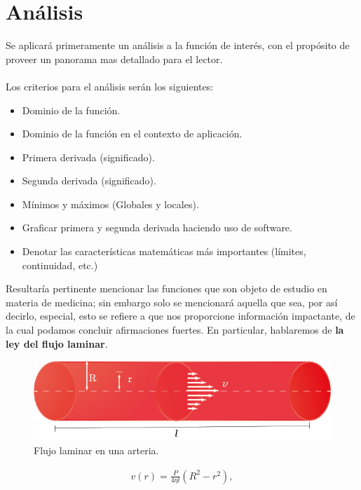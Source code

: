 \section{Análisis}
Se aplicará primeramente un análisis a la función de interés, con el propósito de proveer un panorama mas detallado para el lector. \\ \\
Los criterios para el análisis serán los siguientes:\\
\begin{itemize}
    \item Dominio de la función.
    \item Dominio de la función en el contexto de aplicación.
    \item Primera derivada (significado).
    \item Segunda derivada (significado).
    \item Mínimos y máximos (Globales y locales).
    \item Graficar primera y segunda derivada haciendo uso de software.
    \item Denotar las características matemáticas más importantes (límites, continuidad, etc.)
\end{itemize}
Resultaría pertinente mencionar las funciones que son objeto de estudio en materia de medicina; sin embargo solo se mencionará aquella que sea, por así decirlo, especial, esto se refiere a que nos proporcione información impactante, de la cual podamos concluir afirmaciones fuertes. En particular, hablaremos de \textbf{la ley del flujo laminar}.

\vspace{0.5cm}\begin{figure}[h]
    \centering
    \includegraphics[scale=2.1]{imagenes/a.png}{}
    \caption{Flujo laminar en una arteria.}
    \label{fig:my_label}
\end{figure}
\begin{align}
    v(r)=\frac{P}{4\eta l}(R^{2}-r^{2}) , \label{Poise} 
\end{align}

